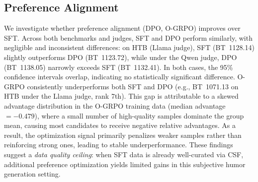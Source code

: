 \documentclass[11pt]{article}
\begin{document}


\subsection{Preference Alignment}

We investigate whether preference alignment (DPO, O-GRPO) improves over SFT. Across both benchmarks and judges, SFT and DPO perform similarly, with negligible and inconsistent differences: on HTB (Llama judge), SFT (BT~1128.14) slightly outperforms DPO (BT~1123.72), while under the Qwen judge, DPO (BT~1138.05) narrowly exceeds SFT (BT~1132.41). In both cases, the 95\% confidence intervals overlap, indicating no statistically significant difference. O-GRPO consistently underperforms both SFT and DPO (e.g., BT~1071.13 on HTB under the Llama judge, rank 7th). This gap is attributable to a skewed advantage distribution in the O-GRPO training data (median advantage $= -0.479$), where a small number of high-quality samples dominate the group mean, causing most candidates to receive negative relative advantages. As a result, the optimization signal primarily penalizes weaker samples rather than reinforcing strong ones, leading to stable underperformance. These findings suggest a \textit{data quality ceiling}: when SFT data is already well-curated via CSF, additional preference optimization yields limited gains in this subjective humor generation setting.
\end{document}
